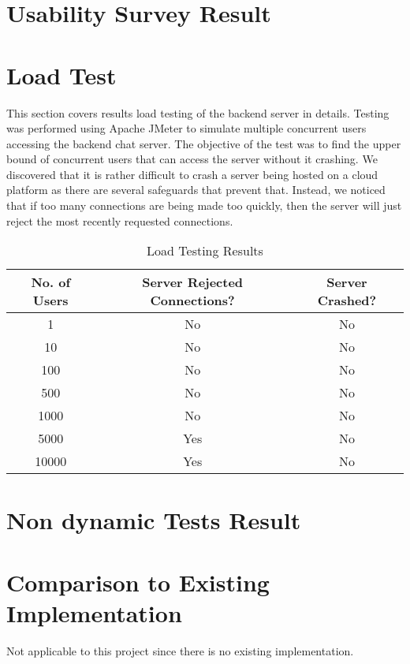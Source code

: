 \documentclass[12pt, titlepage]{article}
\begin{document}
\section{Usability Survey Result}\label{survey}

\section{Load Test}\label{load}

This section covers results load testing of the backend server in details.
Testing was performed using Apache JMeter to simulate multiple concurrent users accessing the backend chat server. The objective of the test was to find the upper bound of concurrent users that can access the server without it crashing.
We discovered that it is rather difficult to crash a server being hosted on a cloud platform as there are several safeguards that prevent that.
Instead, we noticed that if too many connections are being made too quickly, then the server will just reject the most recently requested connections.

\begin{table}[!htbp]
  \centering
  \begin{tabular}{|c|c|c|}
  \hline
  No. of Users & Server Rejected Connections? & Server Crashed? \\ \hline
  1 & No & No \\ \hline
  10 & No & No \\ \hline
  100 & No & No \\ \hline
  500 & No & No \\ \hline
  1000 & No & No \\ \hline
  5000 & Yes & No \\ \hline
  10000 & Yes & No \\ \hline
  \end{tabular}
  \caption{Load Testing Results}
\end{table}

\section{Non dynamic Tests Result}\label{static}

\section{Comparison to Existing Implementation}	

Not applicable to this project since there is no existing implementation.
\end{document}

